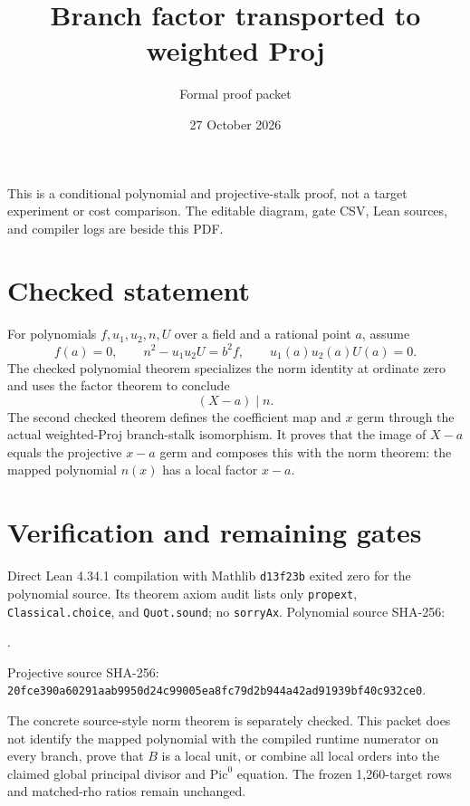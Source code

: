\documentclass[11pt]{article}
\title{Branch factor transported to weighted Proj}
\author{Formal proof packet}
\date{27 October 2026}
\begin{document}
\maketitle
\noindent This is a conditional polynomial and projective-stalk proof, not a target experiment or cost comparison. The editable diagram, gate CSV, Lean sources, and compiler logs are beside this PDF.

\section*{Checked statement}
For polynomials $f,u_1,u_2,n,U$ over a field and a rational point $a$, assume
\[
f(a)=0,\qquad n^2-u_1u_2U=b^2f,\qquad u_1(a)u_2(a)U(a)=0.
\]
The checked polynomial theorem specializes the norm identity at ordinate zero and uses the factor theorem to conclude
\[
(X-a)\mid n.
\]
The second checked theorem defines the coefficient map and $x$ germ through the actual weighted-Proj branch-stalk isomorphism. It proves that the image of $X-a$ equals the projective $x-a$ germ and composes this with the norm theorem: the mapped polynomial $n(x)$ has a local factor $x-a$.

\begin{center}
\setlength{\fboxsep}{9pt}
\end{center}

\section*{Verification and remaining gates}
Direct Lean 4.34.1 compilation with Mathlib \texttt{d13f23b} exited zero for the polynomial source. Its theorem axiom audit lists only \texttt{propext}, \texttt{Classical.choice}, and \texttt{Quot.sound}; no \texttt{sorryAx}. Polynomial source SHA-256:\par\smallskip{}.\par\smallskip\noindent Projective source SHA-256: {\scriptsize\texttt{20fce390a60291aab9950d24c99005ea8fc79d2b944a42ad91939bf40c932ce0}}.

The concrete source-style norm theorem is separately checked. This packet does not identify the mapped polynomial with the compiled runtime numerator on every branch, prove that $B$ is a local unit, or combine all local orders into the claimed global principal divisor and $\mathrm{Pic}^0$ equation. The frozen 1,260-target rows and matched-rho ratios remain unchanged.
\end{document}
